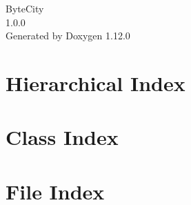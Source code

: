\documentclass[twoside]{book}
\newcommand{\+}{\discretionary{\mbox{\scriptsize$\hookleftarrow$}}{}{}}
\newcommand{\clearemptydoublepage}{%
    \newpage{\pagestyle{empty}\cleardoublepage}%
  }
\begin{document}
  \raggedbottom
    \hypersetup{pageanchor=false,
                bookmarksnumbered=true,
                pdfencoding=unicode
               }
  \begin{titlepage}
  \vspace*{7cm}
  \begin{center}%
  {\Large Byte\+City}\\
  [1ex]\large 1.\+0.\+0 \\
  \vspace*{1cm}
  {\large Generated by Doxygen 1.12.0}\\
  \end{center}
  \end{titlepage}
  \clearemptydoublepage
  \tableofcontents
  \clearemptydoublepage
  \hypersetup{pageanchor=true}

\chapter{Hierarchical Index}

\chapter{Class Index}

\chapter{File Index}

\end{document}
